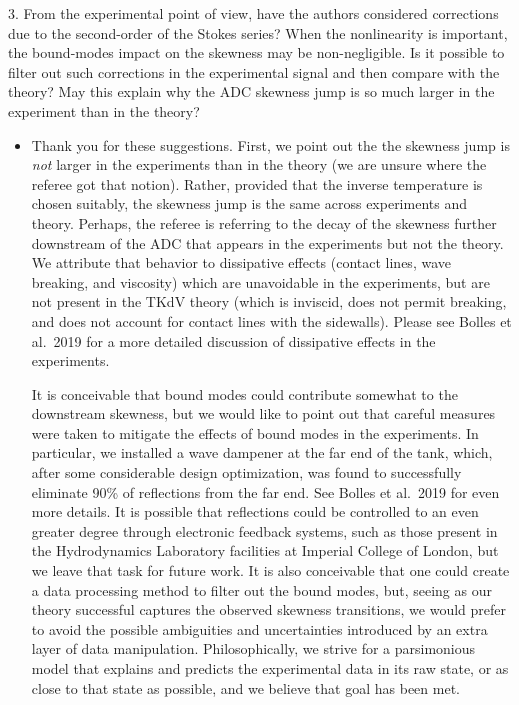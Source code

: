 \documentclass[11pt]{article}
\newcommand{\comment}[1]{{\color{blue} #1}}
\begin{document}
\noindent
\comment{
3. From the experimental point of view, have the authors considered corrections due to the second-order of the Stokes series? When the nonlinearity is important, the bound-modes impact on the skewness may be non-negligible. Is it possible to filter out such corrections in the experimental signal and then compare with the theory? May this explain why the ADC skewness jump is so much larger in the experiment than in the theory?
}
\begin{itemize}
\item Thank you for these suggestions. First, we point out the the skewness jump is {\em not} larger in the experiments than in the theory (we are unsure where the referee got that notion). Rather, provided that the inverse temperature is chosen suitably, the skewness jump is the same across experiments and theory. Perhaps, the referee is referring to the decay of the skewness further downstream of the ADC that appears in the experiments but not the theory. We attribute that behavior to dissipative effects (contact lines, wave breaking, and viscosity) which are unavoidable in the experiments, but are not present in the TKdV theory (which is inviscid, does not permit breaking, and does not account for contact lines with the sidewalls). Please see Bolles et al.~2019 for a more detailed discussion of dissipative effects in the experiments.

It is conceivable that bound modes could contribute somewhat to the downstream skewness, but we would like to point out that careful measures were taken to mitigate the effects of bound modes in the experiments. In particular, we installed a wave dampener at the far end of the tank, which, after some considerable design optimization, was found to successfully eliminate 90\% of reflections from the far end. See Bolles et al.~2019 for even more details. It is possible that reflections could be controlled to an even greater degree through electronic feedback systems, such as those present in the Hydrodynamics Laboratory facilities at Imperial College of London, but we leave that task for future work. It is also conceivable that one could create a data processing method to filter out the bound modes, but, seeing as our theory successful captures the observed skewness transitions, we would prefer to avoid the possible ambiguities and uncertainties introduced by an extra layer of data manipulation. 
Philosophically, we strive for a parsimonious model that explains and predicts the experimental data in its raw state, or as close to that state as possible, and we believe that goal has been met.
\end{itemize}
\end{document}
